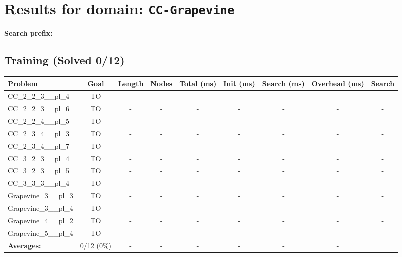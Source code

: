 \documentclass{article}
\begin{document}
\section*{Results for domain: \texttt{CC-Grapevine}}
\textbf{Search prefix:} 
\\[0.5cm]
\subsection*{Training (Solved 0/12)}
\begin{tabular}{lcccccccc}
\toprule
Problem & Goal & Length & Nodes & Total (ms) & Init (ms) & Search (ms) & Overhead (ms) & Search \\
\midrule
CC\_2\_2\_3\_\_pl\_4 & TO & - & - & - & - & - & - & - \\
CC\_2\_2\_3\_\_pl\_6 & TO & - & - & - & - & - & - & - \\
CC\_2\_2\_4\_\_pl\_5 & TO & - & - & - & - & - & - & - \\
CC\_2\_3\_4\_\_pl\_3 & TO & - & - & - & - & - & - & - \\
CC\_2\_3\_4\_\_pl\_7 & TO & - & - & - & - & - & - & - \\
CC\_3\_2\_3\_\_pl\_4 & TO & - & - & - & - & - & - & - \\
CC\_3\_2\_3\_\_pl\_5 & TO & - & - & - & - & - & - & - \\
CC\_3\_3\_3\_\_pl\_4 & TO & - & - & - & - & - & - & - \\
Grapevine\_3\_\_pl\_3 & TO & - & - & - & - & - & - & - \\
Grapevine\_3\_\_pl\_4 & TO & - & - & - & - & - & - & - \\
Grapevine\_4\_\_pl\_2 & TO & - & - & - & - & - & - & - \\
Grapevine\_5\_\_pl\_4 & TO & - & - & - & - & - & - & - \\
\textbf{Averages:} & 0/12 (0\%) & - & - & - & - & - & - & \\
\bottomrule
\end{tabular}
\\[0.7cm]
\end{document}
